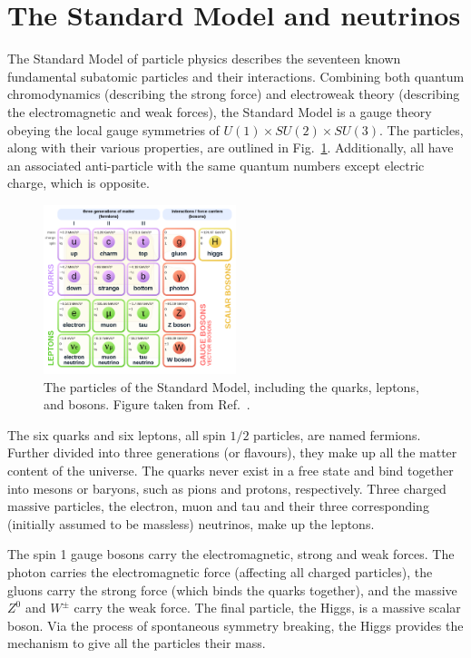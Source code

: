 \section{The Standard Model and neutrinos} %
\label{sec:theory_sm} %

The Standard Model of particle physics describes the seventeen known fundamental subatomic
particles and their interactions. Combining both quantum chromodynamics (describing the strong
force) and electroweak theory (describing the electromagnetic and weak forces), the Standard Model
is a gauge theory obeying the local gauge symmetries of $U(1) \times SU(2) \times SU(3)$. The
particles, along with their various properties, are outlined in Fig.~\ref{fig:sm}. Additionally,
all have an associated anti-particle with the same quantum numbers except electric charge, which
is opposite.

\begin{figure} %
    \includegraphics[origin=c,width=0.5\textwidth]{diagrams/3-theory/sm.png}
    \caption[The particles of the Standard Model]
    {The particles of the Standard Model, including the quarks, leptons, and bosons. Figure taken
        from Ref.~\cite{wiki2020}.}
    \label{fig:sm}
\end{figure}

The six quarks and six leptons, all spin $1/2$ particles, are named fermions. Further divided into
three generations (or flavours), they make up all the matter content of the universe. The quarks
never exist in a free state and bind together into mesons or baryons, such as pions and protons,
respectively.  Three charged massive particles, the electron, muon and tau and their three
corresponding (initially assumed to be massless) neutrinos, make up the leptons.

The spin 1 gauge bosons carry the electromagnetic, strong and weak forces. The photon carries the
electromagnetic force (affecting all charged particles), the gluons carry the strong force (which
binds the quarks together), and the massive $Z^{0}$ and $W^{\pm}$ carry the weak force. The final
particle, the Higgs, is a massive scalar boson. Via the process of spontaneous symmetry breaking,
the Higgs provides the mechanism to give all the particles their mass.

